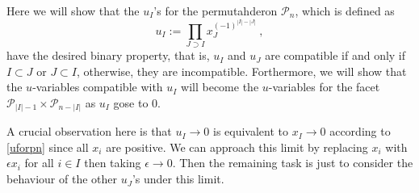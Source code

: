 \documentclass[hidelinks,12pt]{article}
\begin{document}
\begin{enumerate}
Here we will show that the $u_{I}$'s for the permutahderon $\mathscr{P}_{n}$, which is defined as 
\begin{equation}
   u_{I}:= \prod_{J\supset I}x_J^{(-1)^{|I|-|J|}} \:, \label{uforpn}
\end{equation}
have the desired binary property, that is, $u_{I}$ and $u_{J}$ are compatible if and only if $I \subset J$ or $J\subset I$, otherwise, they are incompatible. Forthermore, we will show that the $u$-variables compatible with $u_{I}$ will become the $u$-variables for the facet $\mathscr{P}_{\lvert I \rvert-1}\times \mathscr{P}_{n-\lvert I\rvert}$ as $u_{I}$ gose to 0.

A crucial observation here is that $u_{I}\to 0$ is equivalent to $x_{I}\to 0 $ according to \eqref{uforpn} since all $x_{i}$ are positive. We can approach this limit by replacing $x_{i}$ with $ \epsilon x_{i}$ for all $i\in I$ then taking $\epsilon \to 0$. Then the remaining task is just to consider the behaviour of the other $u_{J}$'s under this limit. 


\end{enumerate}
\end{document}
